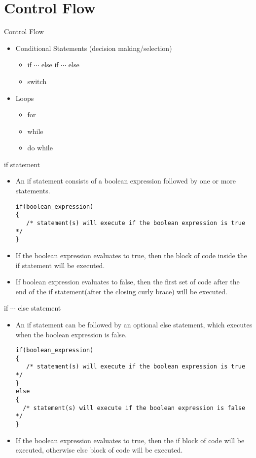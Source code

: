\documentclass[10pt,t]{beamer}
\begin{document}
\section{Control Flow}
\begin{frame}{Control Flow}
  \begin{itemize}
    \item Conditional Statements (decision making/selection)
    \begin{itemize}
      \item if $\cdots$ else if $\cdots$ else
      \item switch
    \end{itemize}
    \item Loops
    \begin{itemize}
      \item for
      \item while
      \item do while
    \end{itemize}
  \end{itemize}
\end{frame}

\begin{frame}[fragile]{if statement}
  \begin{itemize}
    \item An if statement consists of a boolean expression followed by one or more statements.
      \begin{block}{}
        \begin{lstlisting}
if(boolean_expression)
{
   /* statement(s) will execute if the boolean expression is true */
}
        \end{lstlisting}
      \end{block}
    \item If the boolean expression evaluates to true, then the block of code inside the if statement will be executed. 
    \item If boolean expression evaluates to false, then the first set of code after the end of the if statement(after the closing curly brace) will be executed.
  \end{itemize}
\end{frame}

\begin{frame}[fragile]{if $\cdots$ else statement}
  \begin{itemize}
    \item An if statement can be followed by an optional else statement, which executes when the boolean expression is false.
      \begin{block}{}
        \begin{lstlisting}
if(boolean_expression)
{
   /* statement(s) will execute if the boolean expression is true */
}
else
{
  /* statement(s) will execute if the boolean expression is false */
}
        \end{lstlisting}
      \end{block}
    \item If the boolean expression evaluates to true, then the if block of code will be executed, otherwise else block of code will be executed.
  \end{itemize}
\end{frame}
\end{document}
